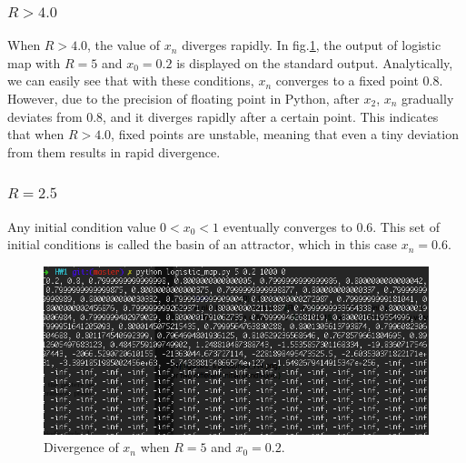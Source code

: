 \documentclass{article}
\begin{document}
\subsubsection*{$R > 4.0$}
When $R > 4.0$, the value of $x_{n}$ diverges rapidly. In fig.\ref{divergence}, the output of logistic map with $R = 5$ and $x_{0} = 0.2$ is displayed on the standard output. Analytically, we can easily see that with these conditions, $x_{n}$ converges to a fixed point $0.8$. However, due to the precision of floating point in Python, after $x_{2}$, $x_{n}$ gradually deviates from 0.8, and it diverges rapidly after a certain point. This indicates that  when $R > 4.0$, fixed points are unstable, meaning that even a tiny deviation from them results in rapid divergence.

\subsubsection*{$R = 2.5$}
Any initial condition value $0 < x_{0} < 1$ eventually converges to 0.6. This set of initial conditions is called the basin of an attractor, which in this case $x_{n} = 0.6$.

\begin{figure}
	\centering
	\includegraphics[scale = 0.4]{figs/screen_shot.png}
	\caption{Divergence of $x_{n}$ when $R = 5$ and $x_{0} = 0.2$.}
	\label{divergence}
\end{figure}
\end{document}
